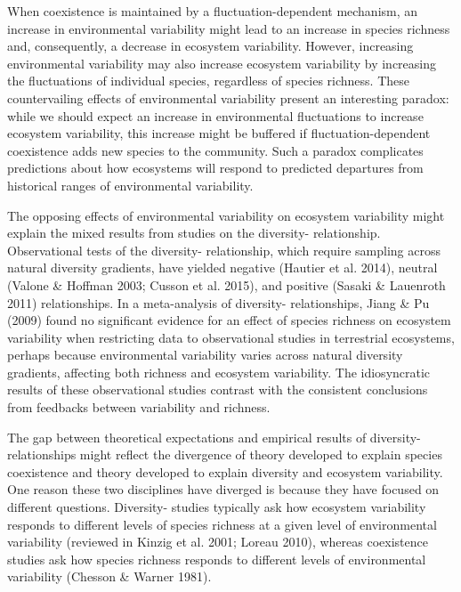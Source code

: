 \documentclass[12pt,]{article}
\begin{document}
When coexistence is maintained by a fluctuation-dependent mechanism, an
increase in environmental variability might lead to an increase in
species richness and, consequently, a decrease in ecosystem variability.
However, increasing environmental variability may also increase
ecosystem variability by increasing the fluctuations of individual
species, regardless of species richness. These countervailing effects of
environmental variability present an interesting paradox: while we
should expect an increase in environmental fluctuations to increase
ecosystem variability, this increase might be buffered if
fluctuation-dependent coexistence adds new species to the community.
Such a paradox complicates predictions about how ecosystems will respond
to predicted departures from historical ranges of environmental
variability.

The opposing effects of environmental variability on ecosystem
variability might explain the mixed results from 
studies on the diversity- relationship.
Observational tests of the diversity-
relationship, which require sampling across natural diversity gradients,
have yielded negative (Hautier et al. 2014), neutral (Valone \& Hoffman
2003; Cusson et al. 2015), and positive (Sasaki \& Lauenroth 2011)
relationships. In a meta-analysis of
diversity- relationships, Jiang \& Pu (2009)
found no significant evidence for an effect of species richness on
ecosystem variability when restricting data to observational studies in
terrestrial ecosystems, perhaps because environmental variability varies
across natural diversity gradients, affecting both richness and
ecosystem variability. The idiosyncratic results of these observational
studies contrast with the consistent conclusions from
feedbacks between variability and richness.

The gap between theoretical expectations and empirical results of
diversity- relationships might reflect the
divergence of theory developed to explain species coexistence and theory
developed to explain diversity and ecosystem variability. One reason
these two disciplines have diverged is because they have focused on
different questions. Diversity- studies
typically ask how ecosystem variability responds to different levels of
species richness at a given level of environmental variability (reviewed
in Kinzig et al. 2001; Loreau 2010), whereas coexistence studies ask how
species richness responds to different levels of environmental
variability (Chesson \& Warner 1981).
\end{document}

